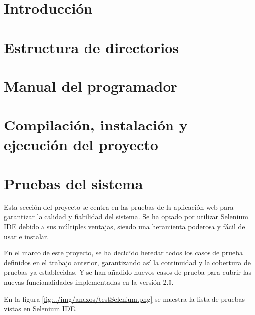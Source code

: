 
\section{Introducción}

\section{Estructura de directorios}

\section{Manual del programador}

\section{Compilación, instalación y ejecución del proyecto}

\section{Pruebas del sistema}
Esta sección del proyecto se centra en las pruebas de la aplicación web para garantizar la calidad y fiabilidad del sistema. Se ha optado por utilizar Selenium IDE debido a sus múltiples ventajas, siendo una heramienta poderosa y fácil de usar e instalar.

En el marco de este proyecto, se ha decidido heredar todos los casos de prueba definidos en el trabajo anterior, garantizando así la continuidad y la cobertura de pruebas ya establecidas. Y se han añadido nuevos casos de prueba para cubrir las nuevas funcionalidades implementadas en la versión 2.0.

En la figura \ref{fig:../img/anexos/testSelenium.png} se muestra la lista de pruebas vistas en Selenium IDE.


